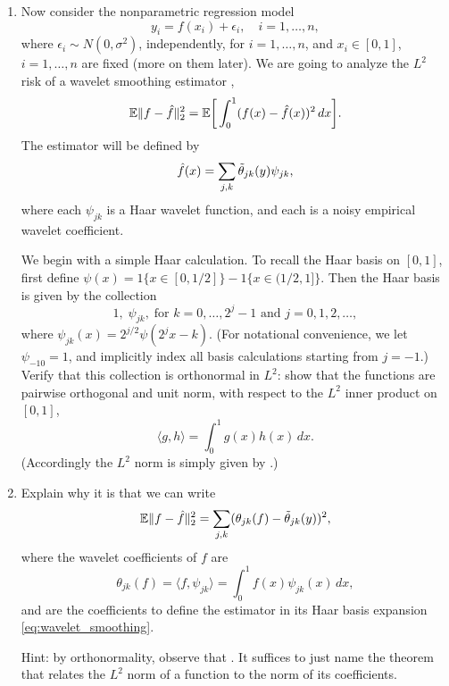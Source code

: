 \documentclass{article}
\begin{document}
\begin{enumerate}[label=(\alph*)]
\item Now consider the nonparametric regression model 
  \begin{equation}
  \label{eq:nonpar_model}
  y_i = f(x_i) + \epsilon_i, \quad i=1,\dots,n,
  \end{equation}
  where $\epsilon_i \sim N(0,\sigma^2)$, independently, for $i=1,\dots,n$, and
  $x_i \in [0,1]$, $i=1,\dots,n$ are fixed (more on them later). We are going to
  analyze the $L^2$ risk of a wavelet smoothing estimator \smash{$\hf$}, 
  \[
  \mathbb{E} \|f - \hat{f}\|_2^2 = \mathbb{E} \bigg[ \int_0^1 (f(x) -  \hat{f}(x))^2 \, dx \bigg].  
  \]
  The estimator \smash{$\hf$} will be defined by 
  \begin{equation}
  \label{eq:wavelet_smoothing}
  \hat{f}(x) = \sum_{j,k} \tilde\theta_{jk}(y) \psi_{jk}, 
  \end{equation}
  where each $\psi_{jk}$ is a Haar wavelet function, and each
   is a noisy empirical wavelet coefficient.

  We begin with a simple Haar calculation. To recall the Haar basis on $[0,1]$, 
  first define $\psi(x) = 1\{x \in [0,1/2]\} - 1\{x \in (1/2,1]\}$. Then the
  Haar basis is given by the collection          
  \[
   1, \; \psi_{jk}, \; \text{for $k = 0, \dots, 2^j-1$ and $j = 0,1,2,\dots$},     
  \]
  where $\psi_{jk}(x) = 2^{j/2} \psi(2^j x - k)$. (For notational convenience,
  we let $\psi_{-10} = 1$, and implicitly index all basis calculations starting 
  from $j=-1$.) Verify that this collection is orthonormal in $L^2$: show that
  the functions are pairwise orthogonal and unit norm, with respect to the $L^2$
  inner product on $[0,1]$,   
  \marginpar{\small [2 pts]}
  \[
  \langle g, h \rangle = \int_0^1 g(x) h(x) \, dx.
  \]
  (Accordingly the $L^2$ norm is simply given by .)   

\item Explain why it is that we can write
  \marginpar{\small [1 pt]}
  \[
  \mathbb{E} \|f - \hat{f}\|_2^2 = \sum_{j,k} (\theta_{jk}(f) - \tilde\theta_{jk}(y))^2,
  \]
  where the wavelet coefficients of $f$ are 
  \[
  \theta_{jk}(f) = \langle f, \psi_{jk} \rangle = \int_0^1 f(x) \psi_{jk}(x) \,
  dx,
  \]
  and  are the coefficients to define the estimator
  \smash{$\hf$} in its Haar basis expansion \eqref{eq:wavelet_smoothing}.    

  Hint: by orthonormality, observe that . It suffices to just name the theorem that relates the $L^2$
  norm of a function to the norm of its coefficients.   


\end{enumerate}
\end{document}
